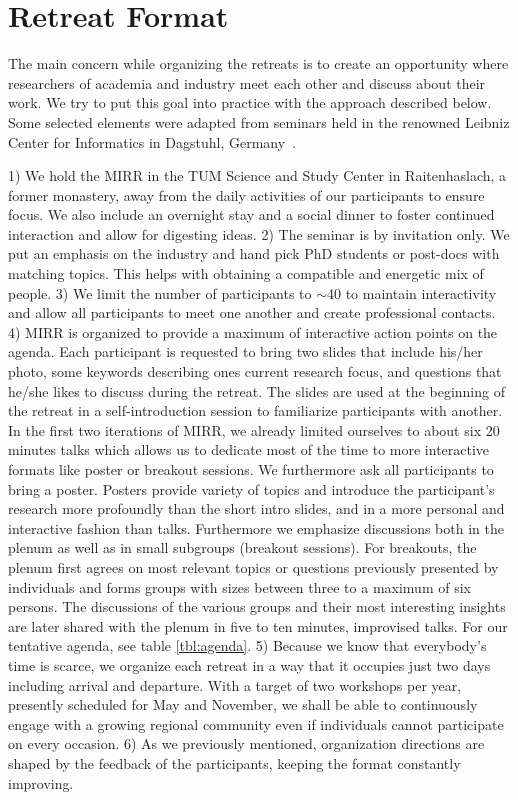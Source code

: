 \section{Retreat Format} \label{sec:intro}

The main concern while organizing the retreats is to create an opportunity where researchers of academia and industry meet each other and discuss about their work. We try to put this goal into practice with the approach described below. Some selected elements were adapted from seminars held in the renowned Leibniz Center for Informatics in Dagstuhl, Germany~\cite{dagstuhl}.

1) We hold the MIRR in the \ac{TUM} Science and Study Center in Raitenhaslach, a former monastery, away from the daily activities of our participants to ensure focus. We also include an overnight stay and a social dinner to foster continued interaction and allow for digesting ideas.
2) The seminar is by invitation only. We put an emphasis on the industry and hand pick PhD students or post-docs with matching topics. This helps with obtaining a compatible and energetic mix of people.
3) We limit the number of participants to $\sim$40 to maintain interactivity and allow all participants to meet one another and create professional contacts.
4) MIRR is organized to provide a maximum of interactive action points on the agenda.
Each participant is requested to bring two slides that include his/her photo, some keywords describing ones current research focus, and questions that he/she likes to discuss during the retreat. The slides are used at the beginning of the retreat in a self-introduction session to familiarize participants with another.
In the first two iterations of \ac{MIRR}, we already limited ourselves to about six 20 minutes talks which allows us to dedicate most of the time to more interactive formats like poster or breakout sessions.
We furthermore ask all participants to bring a poster. Posters provide variety of topics and introduce the participant's research more profoundly than the short intro slides, and in a more personal and interactive fashion than talks.
Furthermore we emphasize discussions both in the plenum as well as in small subgroups (breakout sessions). For breakouts, the plenum first agrees on most relevant topics or questions previously presented by individuals and forms groups with sizes between three to a maximum of six persons. The discussions of the various groups and their most interesting insights are later shared with the plenum in five to ten minutes, improvised talks.
For our tentative agenda, see table \ref{tbl:agenda}.
5) Because we know that everybody's time is scarce, we organize each retreat in a way that it occupies just two days including arrival and departure. With a target of two workshops per year, presently scheduled for May and November, we shall be able to continuously engage with a growing regional community even if individuals cannot participate on every occasion.
6) As we previously mentioned, organization directions are shaped by the feedback of the participants, keeping the format constantly improving. 

